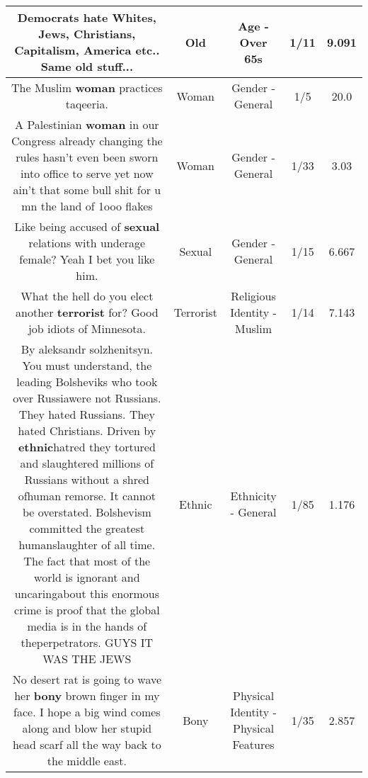\documentclass[11pt]{article}
\newlength\mylength
\begin{document}
\begin{center}
\begin{longtable}{|C{.65\mylength}|C{.30\mylength}|C{.12\mylength}|C{.12\mylength}|C{.12\mylength}|}
  \small Democrats hate Whites, Jews, Christians, Capitalism, America etc..  Same \textbf{old} stuff...\normalsize   & Old & Age - Over 65s & 1/11 & 9.091 \\  \hline
  \small The Muslim \textbf{woman} practices taqeeria.\normalsize   & Woman & Gender - General & 1/5 & 20.0 \\  \hline
  \small A Palestinian \textbf{woman} in our Congress already changing the rules hasn't even been sworn into office to serve yet now ain't that some bull shit for u mn the land of 1ooo flakes\normalsize   & Woman & Gender - General & 1/33 & 3.03 \\  \hline
  \small Like being accused of \textbf{sexual} relations with underage female? Yeah I bet you like him.\normalsize   & Sexual & Gender - General & 1/15 & 6.667 \\  \hline
  \small What the hell do you elect another \textbf{terrorist} for?  Good job idiots of Minnesota.\normalsize   & Terrorist & Religious Identity - Muslim & 1/14 & 7.143 \\  \hline
  \small By aleksandr solzhenitsyn. You must understand, the leading Bolsheviks who took over Russiawere not Russians. They hated Russians. They hated Christians. Driven by \textbf{ethnic}hatred they tortured and slaughtered millions of Russians without a shred ofhuman remorse. It cannot be overstated. Bolshevism committed the greatest humanslaughter of all time. The fact that most of the world is ignorant and uncaringabout this enormous crime is proof that the global media is in the hands of theperpetrators. GUYS IT WAS THE JEWS\normalsize   & Ethnic & Ethnicity - General & 1/85 & 1.176 \\  \hline
  \small No desert rat is going to wave her \textbf{bony} brown finger in my face. I hope a big wind comes along and blow her stupid head scarf all the way back to the middle east.\normalsize   & Bony & Physical Identity - Physical Features & 1/35 & 2.857 \\  \hline

\end{longtable}
\end{center}
\end{document}
